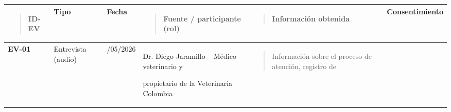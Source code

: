 \documentclass[
]{article}
\newcounter{none} %
\begin{document}
{\def\LTcaptype{none} %
\begin{longtable}[]{@{}
  >{\raggedright\arraybackslash}p{}
  >{\raggedright\arraybackslash}p{}
  >{\centering\arraybackslash}p{}
  >{\raggedright\arraybackslash}p{}
  >{\raggedright\arraybackslash}p{}
  >{\raggedright\arraybackslash}p{}@{}}
\toprule\noalign{}
\begin{minipage}[b]{\linewidth}\raggedright
\begin{quote}
\textbf{ID-EV}
\end{quote}
\end{minipage} & \begin{minipage}[b]{\linewidth}\centering
\textbf{Tipo}
\end{minipage} & \begin{minipage}[b]{\linewidth}\centering
\textbf{Fecha}
\end{minipage} & \begin{minipage}[b]{\linewidth}\raggedright
\begin{quote}
\textbf{Fuente / participante (rol)}
\end{quote}
\end{minipage} & \begin{minipage}[b]{\linewidth}\raggedright
\begin{quote}
\textbf{Información obtenida}
\end{quote}
\end{minipage} & \begin{minipage}[b]{\linewidth}\raggedright
\textbf{Consentimiento}
\end{minipage} \\
\midrule\noalign{}
\endhead
\bottomrule\noalign{}
\endlastfoot
\textbf{EV-01} & Entrevista (audio) & 23/05/2026 & Dr. Diego Jaramillo
-- Médico veterinario y

propietario de la Veterinaria Colombia &
\begin{minipage}[t]{\linewidth}\raggedright
\begin{quote}
Información sobre el proceso de atención, registro de


\end{quote}
\end{minipage}
\end{longtable}}
\end{document}
